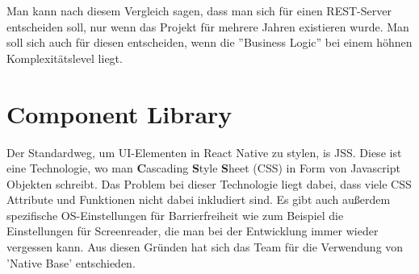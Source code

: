 Man kann nach diesem Vergleich sagen, dass man sich für einen REST-Server entscheiden soll, nur wenn das Projekt für mehrere Jahren existieren wurde. Man soll sich auch für diesen entscheiden, wenn die ''Business Logic'' bei einem höhnen Komplexitätslevel liegt.

\section{Component Library}
Der Standardweg, um UI-Elementen in React Native zu stylen, is JSS. Diese ist eine Technologie, wo man \textbf{C}ascading \textbf{S}tyle \textbf{S}heet (CSS)
in Form von Javascript Objekten schreibt. Das Problem bei dieser Technologie liegt dabei,
dass viele CSS Attribute und Funktionen nicht dabei inkludiert sind. Es gibt auch außerdem spezifische OS-Einstellungen für Barrierfreiheit wie zum Beispiel die Einstellungen für Screenreader,
die man bei der Entwicklung immer wieder vergessen kann.
Aus diesen Gründen hat sich das Team für die Verwendung von 'Native Base' entschieden.

